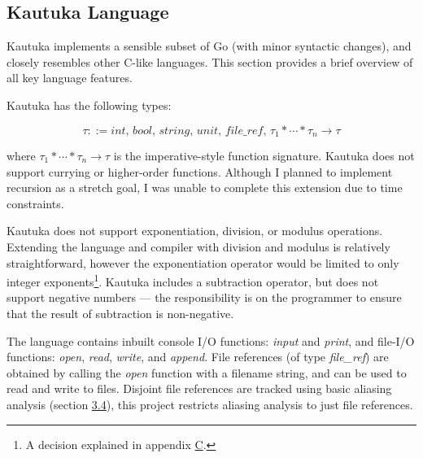 \subsection{Kautuka Language}

\label{sec:2.1.2}

Kautuka implements a sensible subset of Go (with minor syntactic changes), and closely resembles other C-like languages. This section provides a brief overview of all key language features.

Kautuka has the following types:

\vspace{-2mm}

\[ \tau ::= \textit{int, bool, string, unit, file\_ref, } \tau_1 * \cdots * \tau_n \rightarrow \tau \]

\vspace{-3mm}

where \( \tau_1 * \cdots * \tau_n \rightarrow \tau \) is the imperative-style function signature. Kautuka does not support currying or higher-order functions. Although I planned to implement recursion as a stretch goal, I was unable to complete this extension due to time constraints.

Kautuka does not support exponentiation, division, or modulus operations. Extending the language and compiler with division and modulus is relatively straightforward, however the exponentiation operator would be limited to only integer exponents\footnote{A decision explained in appendix \hyperref[sec:C]{C}.}. Kautuka includes a subtraction operator, but does not support negative numbers --- the responsibility is on the programmer to ensure that the result of subtraction is non-negative.

The language contains inbuilt console I/O functions: \textit{input} and \textit{print}, and file-I/O functions: \textit{open}, \textit{read}, \textit{write}, and \textit{append}. File references (of type \textit{file\_ref}) are obtained by calling the \textit{open} function with a filename string, and can be used to read and write to files. Disjoint file references are tracked using basic aliasing analysis (section \hyperref[sec:3.4]{3.4}), this project restricts aliasing analysis to just file references.

